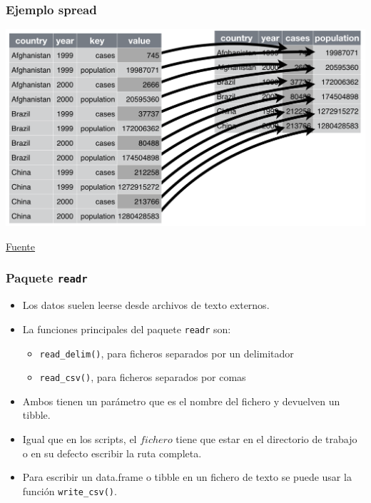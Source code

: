 \documentclass{beamer}
\begin{document}
\begin{frame}[fragile]
\frametitle{Ejemplo spread}
\begin{center}
\includegraphics[width=\textwidth]{tidyr-spread.png}

{\footnotesize \href{http://garrettgman.github.io/tidying/}{Fuente}}
\end{center}
\end{frame}

%
%

\begin{frame}[fragile]
\frametitle{Paquete \texttt{readr}}

\begin{itemize}
\item Los datos suelen leerse desde archivos de texto externos.
\item La funciones principales del paquete \texttt{readr} son:
\begin{itemize}
\item \texttt{read\_delim()}, para ficheros separados por un delimitador
\item \texttt{read\_csv()}, para ficheros separados por comas
\end{itemize}
\item Ambos tienen un parámetro que es el nombre del fichero y devuelven un tibble.
\item Igual que en los scripts, el $fichero$ tiene que estar en el directorio de trabajo o en su defecto escribir la ruta completa.
\item Para escribir un data.frame o tibble en un fichero de texto se puede usar la función \texttt{write\_csv()}.
\end{itemize}

\end{frame}
\end{document}
